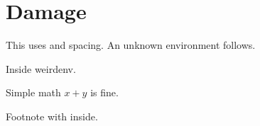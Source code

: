 \documentclass{article}
\begin{document}
\section{Damage}
This uses  and \hspace{2em} spacing.
An unknown environment follows.
\begin{weirdenv}
Inside weirdenv.
\end{weirdenv}
Simple math $x + y$ is fine.

Footnote with  inside.

\end{document}
